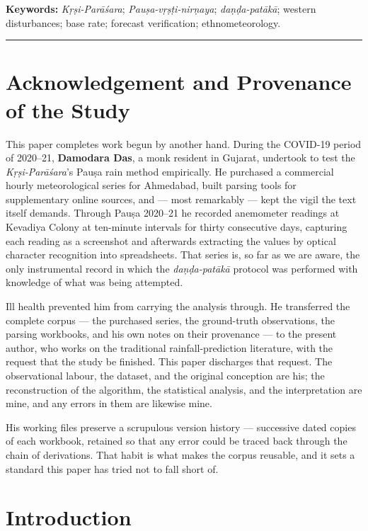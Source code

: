 \documentclass[11pt,a4paper]{article}
\newcommand{\skt}[1]{\textcolor{skt}{\textit{#1}}}
\begin{document}
\vspace{4pt}\noindent\textbf{Keywords:} \skt{Kṛṣi-Parāśara}; \skt{Pauṣa-vṛṣṭi-nirṇaya}; \skt{daṇḍa-patākā}; western disturbances; base rate; forecast verification; ethnometeorology.

\vspace{6pt}\hrule

\section*{Acknowledgement and Provenance of the Study}

This paper completes work begun by another hand. During the COVID-19 period of 2020--21, \textbf{Damodara Das}, a monk resident in Gujarat, undertook to test the \skt{Kṛṣi-Parāśara}'s Pauṣa rain method empirically. He purchased a commercial hourly meteorological series for Ahmedabad, built parsing tools for supplementary online sources, and --- most remarkably --- kept the vigil the text itself demands. Through Pauṣa 2020--21 he recorded anemometer readings at Kevadiya Colony at ten-minute intervals for thirty consecutive days, capturing each reading as a screenshot and afterwards extracting the values by optical character recognition into spreadsheets. That series is, so far as we are aware, the only instrumental record in which the \skt{daṇḍa-patākā} protocol was performed with knowledge of what was being attempted.

Ill health prevented him from carrying the analysis through. He transferred the complete corpus --- the purchased series, the ground-truth observations, the parsing workbooks, and his own notes on their provenance --- to the present author, who works on the traditional rainfall-prediction literature, with the request that the study be finished. This paper discharges that request. The observational labour, the dataset, and the original conception are his; the reconstruction of the algorithm, the statistical analysis, and the interpretation are mine, and any errors in them are likewise mine.

His working files preserve a scrupulous version history --- successive dated copies of each workbook, retained so that any error could be traced back through the chain of derivations. That habit is what makes the corpus reusable, and it sets a standard this paper has tried not to fall short of.

\section{Introduction}
\end{document}
